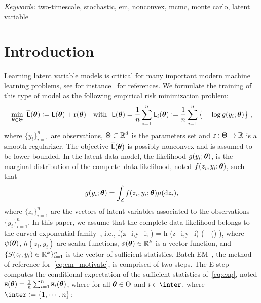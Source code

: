 \documentclass[12pt]{article}
\begin{document}
\noindent%
{\it Keywords:}  two-timescale, stochastic, em, nonconvex, mcmc, monte carlo, latent variable

\newpage

\section{Introduction}


Learning latent variable models is critical for many important modern machine learning problems, see for instance~\citet{mclachlan2007algorithm} for references.
We formulate the training of this type of model as the following {empirical risk minimization} problem:
\begin{align} \label{eq:em_motivate}
\begin{split} 
 \min_{ {\bm{\theta}} \in \Theta }~ \overline{{\textsf{L}}} ( {\bm{\theta}} ) \mathrel{\mathop:}=  {\textsf{L}} ( {\bm{\theta}} ) + \operatorname{r} ({\bm{\theta}}) \quad \text{with}~~{\textsf{L}} ( {\bm{\theta}} ) = \frac{1}{n} \sum_{i=1}^n {\textsf{L}}_i( {\bm{\theta}}) \mathrel{\mathop:}=  \frac{1}{n} \sum_{i=1}^n \big\{ - \log g( y_i ; {\bm{\theta}} ) \big\}\;,
\end{split} 
\end{align}
where $\{y_i\}_{i=1}^n$ are observations, $\Theta \subset \mathbb{R}^d$ is the parameters set and $\operatorname{r} : \Theta \rightarrow \mathbb{R}$ is a smooth regularizer.
The objective $ \overline{{\textsf{L}}} ( {\bm{\theta}} )$ is possibly {nonconvex} and is assumed to be lower bounded. 
In the latent data model, the likelihood $g(y_i ; {\bm{\theta}})$, is the marginal distribution of the complete~data likelihood, noted $f(z_i,y_i; {\bm{\theta}})$, such that 
\begin{align}
g(y_i; {\bm{\theta}}) = \int_{\mathsf{Z}} f (z_i,y_i;{\bm{\theta}}) \mu(\mathrm d z_i),    
\end{align}
where $\{ z_i \}_{i=1}^n$ are the vectors of latent variables associated to the observations $\{y_i\}_{i=1}^n$.
In this paper, we assume that the complete data likelihood belongs to the curved exponential family~\citep{efron1975defining}, i.e.,
\beq \label{eq:exp}
f(z_i,y_i; \param) = h  (z_i,y_i) \exp (  - \psi(\param) )\eqs,
\eeq
where $\psi({\bm{\theta}})$, $h(z_i,y_i)$ are scalar functions, $\phi({\bm{\theta}}) \in \mathbb{R}^k$ is a vector function, and $\{S(z_i,y_i) \in \mathbb{R}^k\}_{i=1}^n$ is the vector of sufficient statistics.
Batch EM~\citep{dempster1977Maximum, wu1983convergence}, the method of reference for~\eqref{eq:em_motivate}, is comprised of two steps. 
The {E-step} computes the conditional expectation of the sufficient statistics of~\eqref{eq:exp}, noted $\overline{{\mathbf{s}}}({\bm{\theta}})= \frac{1}{n} \sum_{i=1}^n \overline{{\mathbf{s}}}_i({\bm{\theta}})$, where for all ${\bm{\theta}} \in \Theta$ and $i \in \inter$, where $\inter \eqdef \{1, \cdots, n\}$:
\end{document}
